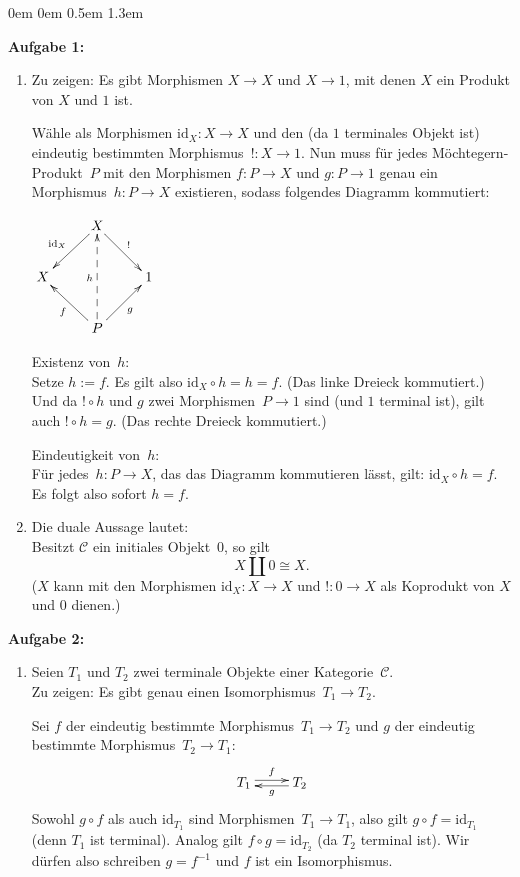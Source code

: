 \documentclass[a4paper,ngerman]{scrartcl}
\theoremstyle{definition}
\theoremstyle{plain}
\theoremstyle{remark}
\newcommand{\C}{\mathcal{C}}
\newcommand{\id}{\mathrm{id}}
\begin{document}
\begin{list}{}{0em \leftmargin0em \itemindent0.5em \itemsep 1.3em}
\item[\textbf{Aufgabe 1:}]\mbox{}
\begin{enumerate}
\item 
Zu zeigen: Es gibt Morphismen $X\to X$ und $X\to 1$, mit denen $X$ ein Produkt von $X$ und $1$ ist.

Wähle als Morphismen $\id_X:X\to X$ und den (da $1$ terminales Objekt ist) eindeutig bestimmten Morphismus~$!:X\to 1$. Nun muss für jedes Möchtegern-Produkt~$P$ mit den Morphismen $f:P\to X$ und $g:P\to 1
$ genau ein Morphismus~$h:P\to X$ existieren, sodass folgendes Diagramm kommutiert:
\begin{center}
$\xymatrix{
 & X \ar[dl]_{\id_X} \ar[dr]^{\mathrm{!}} &\\
X & & 1\\
 & P \ar[ul]^f \ar[ur]_g \ar@{-->}[uu]^h &
}$
\end{center}

Existenz von~$h$:\\
Setze $h:=f$. Es gilt also $\id_X\circ h=h=f$. (Das linke Dreieck kommutiert.) Und da $!\circ h$ und $
g$ zwei Morphismen~$P\to 1$ sind (und $1$ terminal ist), gilt auch $!\circ h=g$. (Das rechte Dreieck kommutiert.)

Eindeutigkeit von~$h$:\\
Für jedes~$h:P\to X$, das das Diagramm kommutieren lässt, gilt: $\id_X\circ h=f$. Es folgt also sofort
 $h=f$.


\item
Die duale Aussage lautet:\\
Besitzt $\C$ ein initiales Objekt~$0$, so gilt
\[X \amalg 0 \cong X.\]
($X$ kann mit den Morphismen $\id_X:X\to X$ und $!:0\to X$ als Koprodukt von $X$ und $0$ dienen.)
\end{enumerate}

\item[\textbf{Aufgabe 2:}]\mbox{}
\begin{enumerate}
\item
Seien $T_1$ und $T_2$ zwei terminale Objekte einer Kategorie~$\C$.\\
Zu zeigen: Es gibt genau einen Isomorphismus~$T_1\to T_2$.

Sei $f$ der eindeutig bestimmte Morphismus~$T_1\to T_2$ und $g$ der eindeutig bestimmte Morphismus~$T_2\to T_1$:
\[ \xymatrix{
T_1\ar@<0.2em>[r]^f & T_2\ar@<0.2em>[l]^g
} \]
Sowohl $g\circ f$ als auch $\id_{T_1}$ sind Morphismen~$T_1\to T_1$, also gilt $g\circ f=\id_{T_1}$ (denn $T_1$ ist terminal). Analog gilt $f\circ g=\id_{T_2}$ (da $T_2$ terminal ist). Wir dürfen also schreiben $g=f^{-1}$ und $f$ ist ein Isomorphismus.


\end{enumerate}
\end{list}
\end{document}
